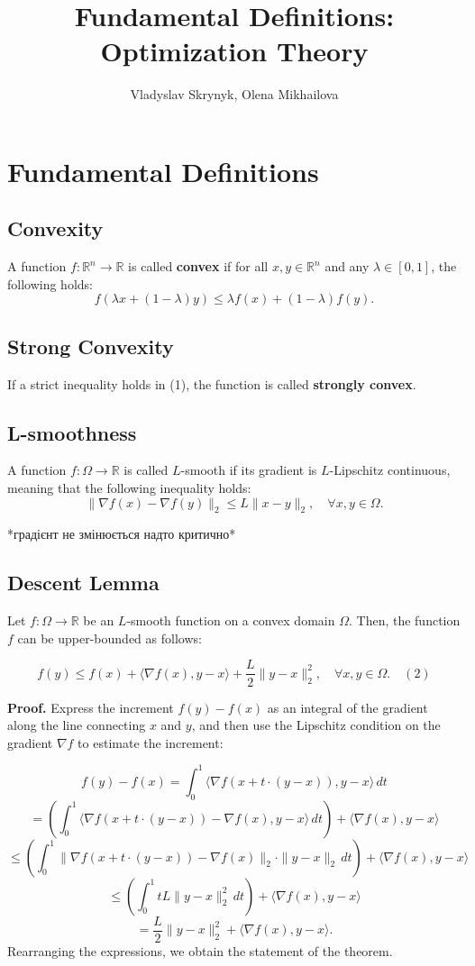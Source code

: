 \documentclass[a4paper,12pt]{article}
\title{Fundamental Definitions: Optimization Theory}
\author{Vladyslav Skrynyk, Olena Mikhailova}
\date{}
\begin{document}
\maketitle

\section{Fundamental Definitions}

\subsection{Convexity}  
A function $f: \mathbb{R}^n \to \mathbb{R}$ is called \textbf{convex} if for all $x, y \in \mathbb{R}^n$ and any $\lambda \in [0,1]$, the following holds:  
\[
    f(\lambda x + (1 - \lambda)y) \leq \lambda f(x) + (1 - \lambda) f(y). \tag{1}
\]  
\subsection{Strong Convexity}  
If a strict inequality holds in (1), the function is called \textbf{strongly convex}.  


\subsection{L-smoothness}  
A function \( f: \Omega \to \mathbb{R} \) is called \( L \)-smooth if its gradient is  
\( L \)-Lipschitz continuous, meaning that the following inequality holds:  
\[
\|\nabla f(x) - \nabla f(y)\|_2 \leq L \|x - y\|_2, \quad \forall x, y \in \Omega.
\]

*градієнт не змінюється надто критично*

\subsection{Descent Lemma}  
Let \( f: \Omega \to \mathbb{R} \) be an \( L \)-smooth function on a convex domain \( \Omega \).  
Then, the function \( f \) can be upper-bounded as follows:

\[
f(y) \leq f(x) + \langle \nabla f(x), y - x \rangle + \frac{L}{2} \|y - x\|_2^2, \quad \forall x, y \in \Omega. \quad (2)
\]
  
\textbf{Proof.} Express the increment \( f(y) - f(x) \) as an integral of the gradient along the line connecting \( x \) and \( y \),  
and then use the Lipschitz condition on the gradient \( \nabla f \) to estimate the increment:

\[
f(y) - f(x) = \int_0^1 \langle \nabla f(x + t \cdot (y - x)), y - x \rangle \, dt
\]
\[
= \left( \int_0^1 \langle \nabla f(x + t \cdot (y - x)) - \nabla f(x), y - x \rangle \, dt \right) + \langle \nabla f(x), y - x \rangle
\]
\[
\leq \left( \int_0^1 \|\nabla f(x + t \cdot (y - x)) - \nabla f(x)\|_2 \cdot \|y - x\|_2 \, dt \right) + \langle \nabla f(x), y - x \rangle
\]
\[
\leq \left( \int_0^1 t L \|y - x\|_2^2 \, dt \right) + \langle \nabla f(x), y - x \rangle
\]
\[
= \frac{L}{2} \|y - x\|_2^2 + \langle \nabla f(x), y - x \rangle.
\]
Rearranging the expressions, we obtain the statement of the theorem.
\end{document}
